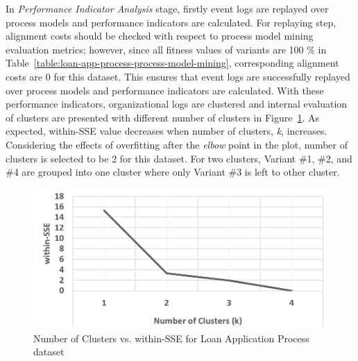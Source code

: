 In \textit{Performance Indicator Analysis} stage, firstly event logs are replayed over process models and performance indicators are calculated. For replaying step, alignment costs should be checked with respect to process model mining evaluation metrics; however, since all fitness values of variants are 100 \% in Table~\ref{table:loan-app-process-process-model-mining}, corresponding alignment costs are 0 for this dataset. This ensures that event logs are successfully replayed over process models and performance indicators are calculated. With these performance indicators, organizational logs are clustered and internal evaluation of clusters are presented with different number of clusters in Figure~\ref{fig:loan-cluster-sse-plot}. As expected, within-SSE value decreases when number of clusters, \textit{k}, increases. Considering the effects of overfitting after the \textit{elbow} point in the plot, number of clusters is selected to be 2 for this dataset. For two clusters, Variant \#1, \#2, and \#4 are grouped into one cluster where only Variant \#3 is left to other cluster.
\begin{figure}
	\centering
	\includegraphics[width=.7\textwidth]{5_results_discussions/loan-application-process/cluster-sse-plot}
	\caption{Number of Clusters vs. within-SSE for Loan Application Process dataset}
  \label{fig:loan-cluster-sse-plot}
\end{figure}

